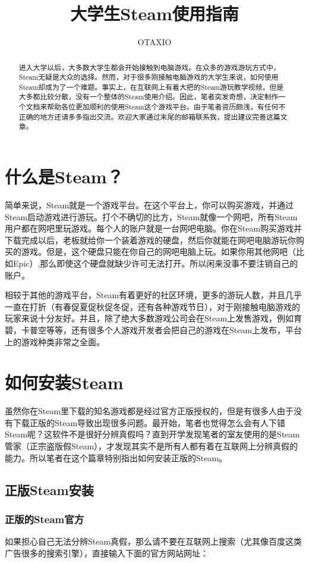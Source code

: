 \documentclass{article}
\title{大学生Steam使用指南}
\author{OTAXIO}
\begin{document}
\maketitle

\begin{abstract}
进入大学以后，大多数大学生都会开始接触到电脑游戏。在众多的游戏游玩方式中，Steam无疑是大众的选择。然而，对于很多刚接触电脑游戏的大学生来说，如何使用Steam却成为了一个难题。事实上，在互联网上有着大把的Steam游玩教学视频，但是大多都比较分散，没有一个整体的Steam使用介绍。因此，笔者突发奇想，决定制作一个文档来帮助各位更加顺利的使用Steam这个游戏平台。由于笔者资历颇浅，有任何不正确的地方还请多多指出交流。欢迎大家通过末尾的邮箱联系我，提出建议完善这篇文章。
\end{abstract}

\section{什么是Steam？}
简单来说，Steam就是一个游戏平台。在这个平台上，你可以购买游戏，并通过Steam启动游戏进行游玩。打个不确切的比方，Steam就像一个网吧，所有Steam用户都在网吧里玩游戏。每个人的账户就是一台网吧电脑。你在Steam购买游戏并下载完成以后，老板就给你一个装着游戏的硬盘，然后你就能在网吧电脑游玩你购买的游戏。但是，这个硬盘只能在你自己的网吧电脑上玩。如果你用其他网吧（比如Epic）,那么即使这个硬盘就缺少许可无法打开。所以闲来没事不要注销自己的账户。

相较于其他的游戏平台，Steam有着更好的社区环境，更多的游玩人数，并且几乎一直在打折（有春促夏促秋促冬促，还有各种游戏节日），对于刚接触电脑游戏的玩家来说十分友好。并且，除了绝大多数游戏公司会在Steam上发售游戏，例如育碧，卡普空等等，还有很多个人游戏开发者会把自己的游戏在Steam上发布，平台上的游戏种类非常之全面。

\section{如何安装Steam}
虽然你在Steam里下载的知名游戏都是经过官方正版授权的，但是有很多人由于没有下载正版的Steam导致出现很多问题。最开始，笔者也觉得怎么会有人下错Steam呢？这软件不是很好分辨真假吗？直到开学发现笔者的室友使用的是Steam管家（正宗盗版假Steam），才发现其实不是所有人都有着在互联网上分辨真假的能力。所以笔者在这个篇章特别指出如何安装正版的Steam。
    \subsection{正版Steam安装}
    \subsubsection{正版的Steam官方}
    如果担心自己无法分辨Steam真假，那么请不要在互联网上搜索（尤其像百度这类广告很多的搜索引擎），直接输入下面的官方网站网址：
    
\end{document}
